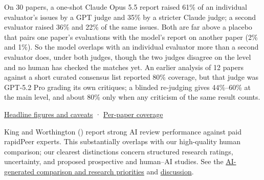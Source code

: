 \documentclass[
  11pt,
  letterpaper,
]{article}
\begin{document}
\begin{tcolorbox}[enhanced jigsaw, colframe=quarto-callout-tip-color-frame, breakable, rightrule=.15mm, toptitle=1mm, opacitybacktitle=0.6, opacityback=0, colback=white, bottomtitle=1mm, leftrule=.75mm, toprule=.15mm, coltitle=black, bottomrule=.15mm, titlerule=0mm, title=\textcolor{quarto-callout-tip-color}{\faLightbulb}\hspace{0.5em}{Can the model find the issues experts find?}, colbacktitle=quarto-callout-tip-color!10!white, arc=.35mm, left=2mm]

On 30 papers, a one-shot Claude Opus 5.5 report raised 61\% of an
individual evaluator's issues by a GPT judge and 35\% by a stricter
Claude judge; a second evaluator raised 36\% and 22\% of the same
issues. Both are far above a placebo that pairs one paper's evaluations
with the model's report on another paper (2\% and 1\%). So the model
overlaps with an individual evaluator more than a second evaluator does,
under both judges, though the two judges disagree on the level and no
human has checked the matches yet. An earlier analysis of 12 papers
against a short curated consensus list reported 80\% coverage, but that
judge was GPT-5.2 Pro grading its own critiques; a blinded re-judging
gives 44\%--60\% at the main level, and about 80\% only when any
criticism of the same result counts.

\hyperref[critique-headline]{Headline figures and caveats} ·
\hyperref[fig-coverage-precision]{Per-paper coverage}

\end{tcolorbox}

\begin{tcolorbox}[enhanced jigsaw, colframe=quarto-callout-note-color-frame, breakable, rightrule=.15mm, toptitle=1mm, opacitybacktitle=0.6, opacityback=0, colback=white, bottomtitle=1mm, leftrule=.75mm, toprule=.15mm, coltitle=black, bottomrule=.15mm, titlerule=0mm, title=\textcolor{quarto-callout-note-color}{\faInfo}\hspace{0.5em}{Related work: King and Worthington (2026) · {AI-generated} note, October
23, 2026}, colbacktitle=quarto-callout-note-color!10!white, arc=.35mm, left=2mm]

King and Worthington ()
report strong AI review performance against paid rapidPeer experts. This
substantially overlaps with our high-quality human comparison; our
clearest distinctions concern structured research ratings, uncertainty,
and proposed prospective and human--AI studies. See the
\hyperref[sec-peerless-context]{AI-generated comparison and research
priorities} and \hyperref[sec-peerless]{discussion}.

\end{tcolorbox}
\end{document}
